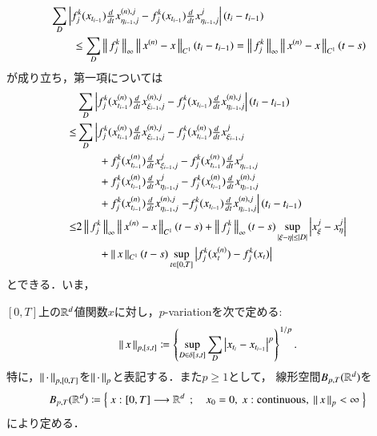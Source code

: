 \begin{prf}
\begin{align}
		&\sum_D \left|f^k_j(x_{t_{i-1}}) \tfrac{d}{dt}x^{(n),j}_{\eta_{i-1},j}
			- f^k_j(x_{t_{i-1}}) \tfrac{d}{dt}x^j_{\eta_{i-1},j} \right|(t_i - t_{i-1}) \\
		&\qquad \leq \sum_D \left\|\, f^k_j\, \right\|_{\infty} \left\|\, x^{(n)} - x\, \right\|_{C^1} (t_i - t_{i-1})
		= \left\|\, f^k_j\, \right\|_{\infty} \left\|\, x^{(n)} - x\, \right\|_{C^1}(t - s)
	\end{align}
	が成り立ち，第一項については
	\begin{align}
		&\sum_D \left| f^k_j(x^{(n)}_{t_{i-1}}) \tfrac{d}{dt}x^{(n),j}_{\xi_{i-1},j} 
			- f^k_j(x_{t_{i-1}}) \tfrac{d}{dt}x^{(n),j}_{\eta_{i-1},j} \right|(t_i - t_{i-1}) \\
		\leq &\sum_D \left| f^k_j(x^{(n)}_{t_{i-1}}) \tfrac{d}{dt}x^{(n),j}_{\xi_{i-1},j} 
			- f^k_j(x^{(n)}_{t_{i-1}}) \tfrac{d}{dt}x^{j}_{\xi_{i-1},j} \right.\\
			&\qquad + f^k_j(x^{(n)}_{t_{i-1}}) \tfrac{d}{dt}x^{j}_{\xi_{i-1},j}
			- f^k_j(x^{(n)}_{t_{i-1}}) \tfrac{d}{dt}x^{j}_{\eta_{i-1},j} \\
			&\qquad + f^k_j(x^{(n)}_{t_{i-1}}) \tfrac{d}{dt}x^{j}_{\eta_{i-1},j}
			- f^k_j(x^{(n)}_{t_{i-1}}) \tfrac{d}{dt}x^{(n),j}_{\eta_{i-1},j} \\
			&\qquad + f^k_j(x^{(n)}_{t_{i-1}}) \tfrac{d}{dt}x^{(n),j}_{\eta_{i-1},j}
			\left. - f^k_j(x_{t_{i-1}}) \tfrac{d}{dt}x^{(n),j}_{\eta_{i-1},j} \right|(t_i - t_{i-1}) \\
		\leq &2\left\|\, f^k_j\, \right\|_{\infty} \left\|\, x^{(n)} - x\, \right\|_{C^1}(t - s)
			+ \left\|\, f^k_j\, \right\|_{\infty}(t-s) \operatorname*{sup}_{|\xi - \eta| \leq |D|} \left|x^j_\xi - x^j_\eta \right| \\
			&\qquad + \left\|\, x\, \right\|_{C^1}(t-s)\operatorname*{sup}_{t \in [0,T]} \left|f^k_j(x^{(n)}_t) - f^k_j(x_t) \right|
	\end{align}
	とできる．いま，
\end{prf}

\begin{screen}
	\begin{dfn}[$p$-variation]
		$[0,T]$上の$\mathbb{R}^d$値関数$x$に対し，$p$-variationを次で定める:
		\begin{align}
			\left\|\, x\, \right\|_{p,[s,t]}
			\coloneqq \left\{ \operatorname*{sup}_{D \in \delta[s,t]} \sum_{D} 
				\left| x_{t_i} - x_{t_{i-1}} \right|^p \right\}^{1/p}.
		\end{align}
		特に，$\left\|\, \cdot\, \right\|_{p,[0,T]}$を$\left\|\, \cdot\, \right\|_{p}$と表記する．また$p \geq 1$として，
		線形空間$B_{p,T}(\mathbb{R}^d)$を
		\begin{align}
			B_{p,T}(\R^d)
			\coloneqq \Set{x:[0,T] \longrightarrow \R^d}{x_0=0,\ x:\mbox{continuous},\ \Norm{x}{p} < \infty}
		\end{align}
		により定める．
	\end{dfn}
\end{screen}

